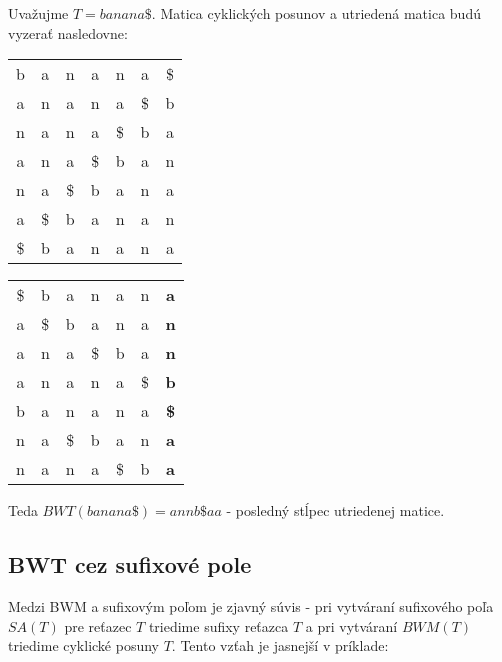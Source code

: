     \begin{example}
        \label{ex:bwt_banana}
        Uvažujme $T = banana\$$. Matica cyklických posunov a utriedená matica 
        budú vyzerať nasledovne:
        
        \bigskip
        
        \begin{minipage}{2.5in}
            \begin{tabular}{ c c c c c c c }
                b  & a  & n  & a  & n  & a  & \$ \\
                a  & n  & a  & n  & a  & \$ & b  \\
                n  & a  & n  & a  & \$ & b  & a  \\
                a  & n  & a  & \$ & b  & a  & n  \\
                n  & a  & \$ & b  & a  & n  & a  \\
                a  & \$ & b  & a  & n  & a  & n  \\
                \$ & b  & a  & n  & a  & n  & a  \\
            \end{tabular}
        \end{minipage}
        \begin{minipage}{2.5in}
            \begin{tabular}{ c c c c c c c }
                \$ & b  & a  & n  & a  & n  & \textbf{a}  \\            
                a  & \$ & b  & a  & n  & a  & \textbf{n}  \\
                a  & n  & a  & \$ & b  & a  & \textbf{n}  \\
                a  & n  & a  & n  & a  & \$ & \textbf{b}  \\
                b  & a  & n  & a  & n  & a  & \textbf{\$} \\
                n  & a  & \$ & b  & a  & n  & \textbf{a}  \\ 
                n  & a  & n  & a  & \$ & b  & \textbf{a}  \\
            \end{tabular}
        \end{minipage}
        
        \bigskip
        
        Teda $BWT(banana\$) = annb\$aa$ - posledný stĺpec utriedenej matice.
    \end{example}

    \subsection{BWT cez sufixové pole}
    Medzi BWM a sufixovým poľom je zjavný súvis - pri vytváraní sufixového poľa
    $SA(T)$ pre reťazec $T$ triedime sufixy reťazca $T$ a pri vytváraní $BWM(T)$
    triedime cyklické posuny $T$. Tento vzťah je jasnejší v príklade:
    

